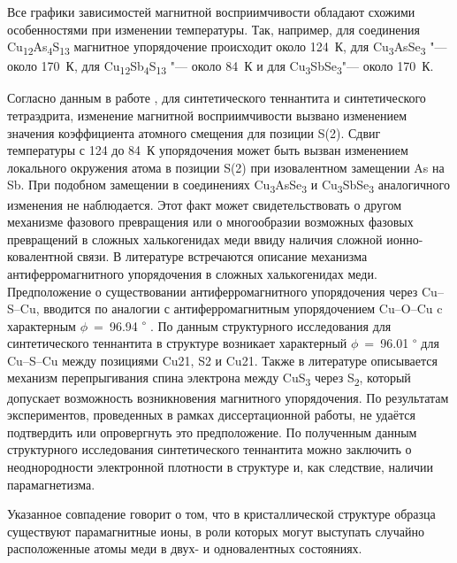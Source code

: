 Все графики зависимостей магнитной восприимчивости обладают схожими особенностями при изменении температуры. Так, например, для соединения Cu\textsubscript{12}As\textsubscript{4}S\textsubscript{13} магнитное упорядочение происходит около 124~К, для Cu\textsubscript{3}AsSe\textsubscript{3} "--- около 170~К, для Cu\textsubscript{12}Sb\textsubscript{4}S\textsubscript{13}  "--- около 84~К и для Cu\textsubscript{3}SbSe\textsubscript{3}"--- около 170~К.

Согласно данным в работе \cite{Nasonova2016}, для синтетического теннантита и синтетического тетраэдрита, изменение магнитной восприимчивости вызвано изменением значения коэффициента атомного смещения для позиции S(2). Сдвиг температуры с 124 до 84~К упорядочения может быть вызван изменением локального окружения атома в позиции S(2) при изовалентном замещении As на Sb.
При подобном замещении в соединениях Cu\textsubscript{3}AsSe\textsubscript{3} и Cu\textsubscript{3}SbSe\textsubscript{3} аналогичного изменения не наблюдается. Этот факт может свидетельствовать о другом механизме фазового превращения или о многообразии возможных фазовых превращений в сложных халькогенидах меди ввиду наличия сложной ионно-ковалентной связи.
В литературе встречаются описание механизма антиферромагнитного упорядочения в сложных халькогенидах меди. Предположение о существовании антиферромагнитного упорядочения через Cu--S--Cu, вводится по аналогии с антиферромагнитным упорядочением Cu--O--Cu\cite{Crawford1976} c характерным $\phi$~=~96.94\textsuperscript{ $\circ$ }. По данным структурного исследования для синтетического теннантита в структуре возникает характерный $\phi$~=~96.01\textsuperscript{ $\circ$ } для Cu--S--Cu между позициями Cu21, S2 и Cu21. Также в литературе описывается механизм\cite{Gainov2008,Gainov_2006} перепрыгивания спина электрона между CuS\textsubscript{3} через S\textsubscript{2}, который допускает возможность возникновения магнитного упорядочения. По результатам экспериментов, проведенных в рамках диссертационной работы, не удаётся подтвердить или опровергнуть это предположение. По полученным данным структурного исследования синтетического теннантита можно заключить о неоднородности электронной плотности в структуре и, как следствие, наличии парамагнетизма.


Указанное совпадение говорит о том, что в кристаллической структуре образца существуют парамагнитные ионы, в роли которых могут выступать случайно расположенные атомы меди в двух- и одновалентных состояниях.

